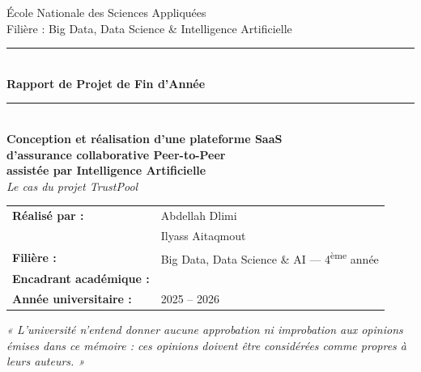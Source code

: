 \documentclass[12pt,a4paper]{report}
\begin{document}
\begin{titlepage}
\centering
\vspace*{0.5cm}


{\large École Nationale des Sciences Appliquées}\\[0.2cm]
{\large Filière : Big Data, Data Science \& Intelligence Artificielle}\\[1.5cm]

\rule{\linewidth}{0.5pt}\\[0.4cm]
{\Huge\bfseries Rapport de Projet de Fin d'Année}\\[0.4cm]
\rule{\linewidth}{0.5pt}\\[1.2cm]

{\Large\bfseries Conception et réalisation d'une plateforme SaaS\\[0.2cm]
d'assurance collaborative Peer-to-Peer\\[0.2cm]
assistée par Intelligence Artificielle}\\[0.5cm]

{\large \textit{Le cas du projet TrustPool}}\\[2cm]

\begin{tabular}{ll}
\textbf{Réalisé par :} & Abdellah Dlimi \\
 & Ilyass Aitaqmout \\[0.4cm]
\textbf{Filière :} & Big Data, Data Science \& AI — 4\textsuperscript{ème} année \\[0.4cm]
\textbf{Encadrant académique :} & \underline{\hspace{6cm}} \\[0.4cm]
\textbf{Année universitaire :} & 2025 -- 2026 \\
\end{tabular}

\vfill
\end{titlepage}

\thispagestyle{empty}
\begin{center}
\vspace*{2cm}
\textit{« L'université n'entend donner aucune approbation ni improbation aux opinions émises dans ce mémoire : ces opinions doivent être considérées comme propres à leurs auteurs. »}
\end{center}
\newpage
\end{document}
